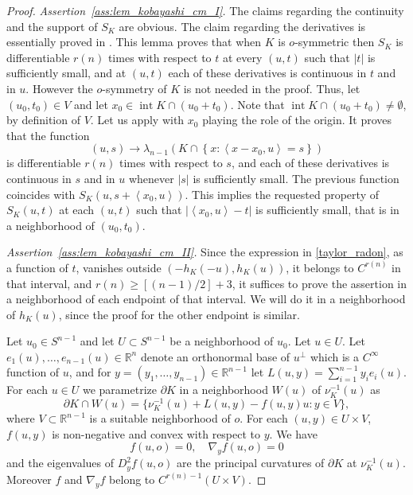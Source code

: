 \documentclass[a4paper]{amsart}
\theoremstyle{definition}
\numberwithin{equation}{section}
\begin{document}
\begin{proof}
\emph{Assertion~\eqref{ass:lem_kobayashi_cm_I}.} The claims regarding the continuity and the support of $S_K$ are obvious.  
The claim regarding the derivatives is essentially proved in \cite[Lemma~2.4]{Kol05}. This lemma proves that when $K$ is $o$-symmetric then $S_K$ is differentiable ${{r(n)}}$ times with respect to $t$ at every $(u,t)$ such that $|t|$ is sufficiently small, and at  $(u,t)$ each of these derivatives is continuous in  $t$ and in $u$. However the $o$-symmetry of $K$  is not needed in the proof. 
Thus, let $(u_0,t_0)\in V$ and let $x_0\in{{\operatorname{int}}} K\cap (u_0+t_0)$. Note that ${{\operatorname{int}}} K\cap (u_0+t_0)\neq\emptyset$, by definition of $V$. Let us apply \cite[Lemma~2.4]{Kol05} with $x_0$ playing the role of the origin. It proves that   the function
\[
(u,s)\to{{\lambda}}_{n-1}\left(K\cap\left\{x : \left<x-x_0,u\right>=s\right\}\right)
\]
is differentiable ${{r(n)}}$ times with respect to $s$, and each of these derivatives is continuous in  $s$ and in $u$ whenever $|s|$ is sufficiently small.
The previous function coincides with $S_K(u,s+\left<x_0,u\right>)$. This implies the  requested property of $S_K(u,t)$  at each $(u,t)$ such that $|\left<x_0,u\right>-t|$ is sufficiently small, that is in a neighborhood of  $(u_0,t_0)$.

\emph{Assertion~\eqref{ass:lem_kobayashi_cm_II}.}
Since the expression in \eqref{taylor_radon}, as a function of $t$, vanishes outside $(-h_K(-u), h_K(u))$, it  belongs to $C^{{r(n)}}$ in that interval,  and ${{r(n)}}\geq[(n-1)/2]+3$, it suffices to prove the assertion in a neighborhood of each endpoint of that interval. We will do it in a neighborhood of $h_K(u)$, since the proof for the other endpoint is similar.
 
Let $u_0\in {S^{n-1}}$ and let $U\subset{S^{n-1}}$ be a neighborhood of  $u_0$. Let $u\in U$. Let $e_1(u),\dots,e_{n-1}(u)\in {\mathbb{R}}^n$ denote an orthonormal base of $u^\perp$ which is a $C^\infty$ function of $u$, and for $y=(y_1,\dots,y_{n-1})\in{\mathbb{R}}^{n-1}$ let $L(u,y)=\sum_{i=1}^{n-1}y_i e_i(u)$. 
For each $u\in U$ we parametrize ${{\partial}} K$ in a neighborhood $W(u)$ of $\nu^{-1}_K(u)$ as 
\[
 {{\partial}} K\cap W(u)=\{\nu^{-1}_K(u)+L(u,y)-f(u,y) u : y\in V\},
\]
where $V\subset{\mathbb{R}}^{n-1}$ is a suitable neighborhood of $o$. For each $(u,y)\in U\times V$, $f(u,y)$ is non-negative and convex with respect to $y$. We have
\[
 f(u,o)=0,\quad\nabla_y f(u,o)=0
\]
and the eigenvalues of $D^2_y f(u,o)$ are the principal curvatures of ${{\partial}} K$ at $\nu_K^{-1}(u)$. Moreover $f$ and $\nabla_y f$ belong to $C^{{{r(n)}}-1}(U\times V)$.


\end{proof}
\end{document}
